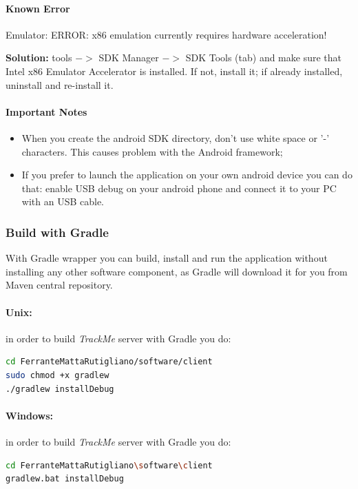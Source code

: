 \documentclass[a4paper]{article}
\begin{document}
\paragraph{Known Error}
Emulator: ERROR: x86 emulation currently requires hardware acceleration!

\textbf{Solution:} tools ${->}$ SDK Manager ${->}$ SDK Tools (tab) and make sure that Intel x86 Emulator Accelerator is installed. If not, install it; if already installed, uninstall and re-install it.

\paragraph{Important Notes}
\begin{itemize}
    \item When you create the android SDK directory, don't use white space or '-' characters. This causes problem with the Android framework;
    \item If you prefer to launch the application on your own android device you can do that: enable USB debug on your android phone and connect it to your PC with an USB cable.
\end{itemize}

\subsubsection{Build with Gradle}
With Gradle wrapper you can build, install and run the application without installing any other software component, as Gradle will download it for you from Maven central repository.

\paragraph{Unix:} in order to build \textit{TrackMe} server with Gradle you do:

\begin{lstlisting}[language=bash]
cd FerranteMattaRutigliano/software/client
sudo chmod +x gradlew
./gradlew installDebug
\end{lstlisting}

\paragraph{Windows:} in order to build \textit{TrackMe} server with Gradle you do:

\begin{lstlisting}[language=bash]
cd FerranteMattaRutigliano\software\client
gradlew.bat installDebug
\end{lstlisting}
\end{document}

